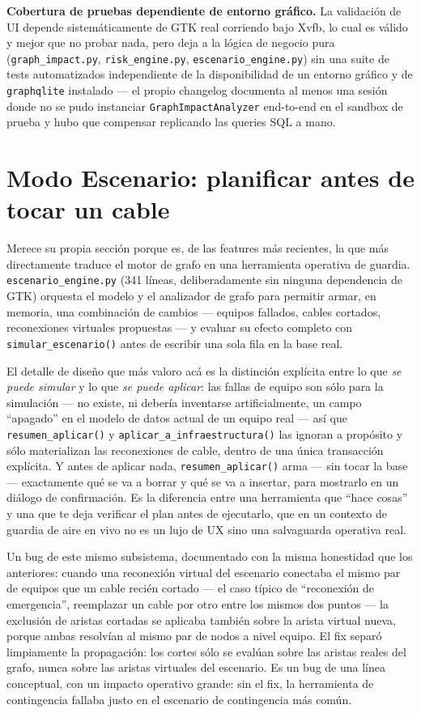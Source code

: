 \documentclass[11pt,twocolumn]{article}
\begin{document}
\textbf{Cobertura de pruebas dependiente de entorno gráfico.} La validación de UI depende sistemáticamente de GTK real corriendo bajo Xvfb, lo cual es válido y mejor que no probar nada, pero deja a la lógica de negocio pura (\texttt{graph\_impact.py}, \texttt{risk\_engine.py}, \texttt{escenario\_engine.py}) sin una suite de tests automatizados independiente de la disponibilidad de un entorno gráfico y de \texttt{graphqlite} instalado --- el propio changelog documenta al menos una sesión donde no se pudo instanciar \texttt{GraphImpactAnalyzer} end-to-end en el sandbox de prueba y hubo que compensar replicando las queries SQL a mano.

\section{Modo Escenario: planificar antes de tocar un cable}

Merece su propia sección porque es, de las features más recientes, la que más directamente traduce el motor de grafo en una herramienta operativa de guardia. \texttt{escenario\_engine.py} (341 líneas, deliberadamente sin ninguna dependencia de GTK) orquesta el modelo y el analizador de grafo para permitir armar, en memoria, una combinación de cambios --- equipos fallados, cables cortados, reconexiones virtuales propuestas --- y evaluar su efecto completo con \texttt{simular\_escenario()} antes de escribir una sola fila en la base real.

El detalle de diseño que más valoro acá es la distinción explícita entre lo que \emph{se puede simular} y lo que \emph{se puede aplicar}: las fallas de equipo son sólo para la simulación --- no existe, ni debería inventarse artificialmente, un campo ``apagado'' en el modelo de datos actual de un equipo real --- así que \texttt{resumen\_aplicar()} y \texttt{aplicar\_a\_infraestructura()} las ignoran a propósito y sólo materializan las reconexiones de cable, dentro de una única transacción explícita. Y antes de aplicar nada, \texttt{resumen\_aplicar()} arma --- sin tocar la base --- exactamente qué se va a borrar y qué se va a insertar, para mostrarlo en un diálogo de confirmación. Es la diferencia entre una herramienta que ``hace cosas'' y una que te deja verificar el plan antes de ejecutarlo, que en un contexto de guardia de aire en vivo no es un lujo de UX sino una salvaguarda operativa real.

Un bug de este mismo subsistema, documentado con la misma honestidad que los anteriores: cuando una reconexión virtual del escenario conectaba el mismo par de equipos que un cable recién cortado --- el caso típico de ``reconexión de emergencia'', reemplazar un cable por otro entre los mismos dos puntos --- la exclusión de aristas cortadas se aplicaba también sobre la arista virtual nueva, porque ambas resolvían al mismo par de nodos a nivel equipo. El fix separó limpiamente la propagación: los cortes sólo se evalúan sobre las aristas reales del grafo, nunca sobre las aristas virtuales del escenario. Es un bug de una línea conceptual, con un impacto operativo grande: sin el fix, la herramienta de contingencia fallaba justo en el escenario de contingencia más común.
\end{document}
